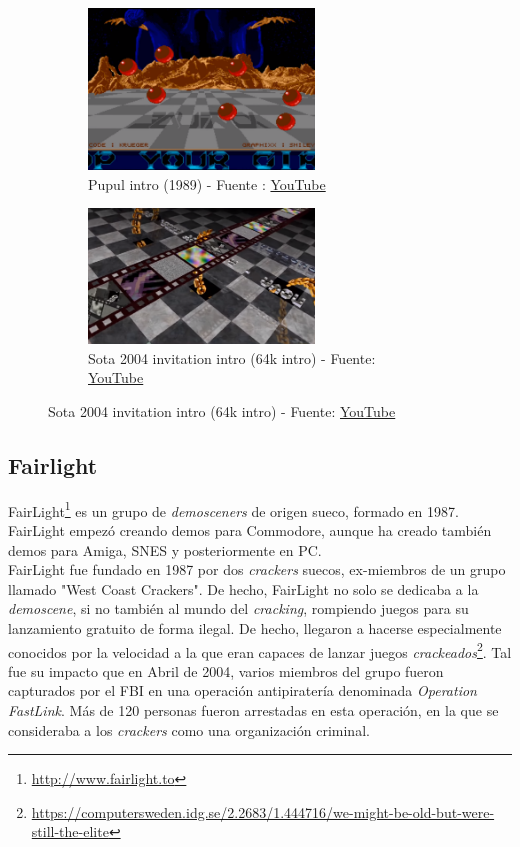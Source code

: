 \begin{figure}[h]
	\centering
	\begin{subfigure}[b]{0.45\textwidth}
		\centering
		\includegraphics[width=6cm]{archivos/equinox1}
		\caption{Pupul intro (1989) - Fuente : \href{https://www.youtube.com/watch?v=efjEJIj5rhM}{YouTube}}
		\label{fig:equinox1}
	\end{subfigure}
	\begin{subfigure}[b]{0.45\textwidth}
		\centering
		\includegraphics[width=6cm]{archivos/equinox2}
		\caption{Sota 2004 invitation intro (64k intro) - Fuente: \href{https://www.youtube.com/watch?v=cb8i0WYDLxM}{YouTube}}
		\label{fig:equinox2}
	\end{subfigure}
\end{figure}

\subsection{Fairlight}

FairLight\footnote{\url{http://www.fairlight.to}} es un grupo de \emph{demosceners} de origen sueco, formado en 1987. FairLight empezó creando demos para Commodore, aunque ha creado también demos para Amiga, SNES y posteriormente en PC.\\

FairLight fue fundado en 1987 por dos \emph{crackers} suecos, ex-miembros de un grupo llamado "West Coast Crackers". De hecho, FairLight no solo se dedicaba a la \emph{demoscene}, si no también al mundo del \emph{cracking}, rompiendo juegos para su lanzamiento gratuito de forma ilegal. De hecho, llegaron a hacerse especialmente conocidos por la velocidad a la que eran capaces de lanzar juegos \emph{crackeados}\footnote{\url{https://computersweden.idg.se/2.2683/1.444716/we-might-be-old-but-were-still-the-elite}}. Tal fue su impacto que en Abril de 2004, varios miembros del grupo fueron capturados por el FBI en una operación antipiratería denominada \emph{Operation FastLink}. Más de 120 personas fueron arrestadas en esta operación, en la que se consideraba a los \emph{crackers} como una organización criminal.\\

